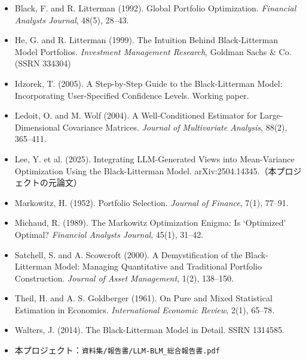 \documentclass[xelatex,ja=standard,jafont=hiragino-pron,a4paper,11pt,openany]{bxjsreport}
\newcommand{\code}[1]{\texttt{#1}}
\begin{document}
\begin{itemize}[leftmargin=1.2em,itemsep=0.4em]
\item Black, F. and R. Litterman (1992). Global Portfolio Optimization. \textit{Financial Analysts Journal}, 48(5), 28--43.
\item He, G. and R. Litterman (1999). The Intuition Behind Black-Litterman Model Portfolios. \textit{Investment Management Research}, Goldman Sachs \& Co. (SSRN 334304)
\item Idzorek, T. (2005). A Step-by-Step Guide to the Black-Litterman Model: Incorporating User-Specified Confidence Levels. Working paper.
\item Ledoit, O. and M. Wolf (2004). A Well-Conditioned Estimator for Large-Dimensional Covariance Matrices. \textit{Journal of Multivariate Analysis}, 88(2), 365--411.
\item Lee, Y. et al. (2025). Integrating LLM-Generated Views into Mean-Variance Optimization Using the Black-Litterman Model. arXiv:2504.14345.（本プロジェクトの元論文）
\item Markowitz, H. (1952). Portfolio Selection. \textit{Journal of Finance}, 7(1), 77--91.
\item Michaud, R. (1989). The Markowitz Optimization Enigma: Is `Optimized' Optimal? \textit{Financial Analysts Journal}, 45(1), 31--42.
\item Satchell, S. and A. Scowcroft (2000). A Demystification of the Black-Litterman Model: Managing Quantitative and Traditional Portfolio Construction. \textit{Journal of Asset Management}, 1(2), 138--150.
\item Theil, H. and A. S. Goldberger (1961). On Pure and Mixed Statistical Estimation in Economics. \textit{International Economic Review}, 2(1), 65--78.
\item Walters, J. (2014). The Black-Litterman Model in Detail. SSRN 1314585.
\item 本プロジェクト：\code{資料集/報告書/LLM-BLM\_総合報告書.pdf}
\end{itemize}
\end{document}
